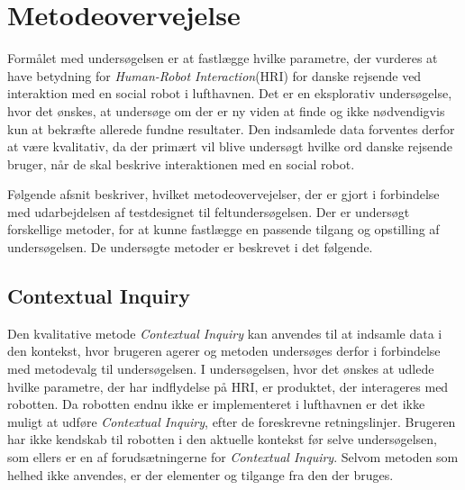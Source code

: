 \section{Metodeovervejelse}
\label{ParametreMetodeovervejelser}
%
Formålet med undersøgelsen er at fastlægge hvilke parametre, der vurderes at have betydning for \textit{Human-Robot Interaction}(HRI) for danske rejsende ved interaktion med en social robot i lufthavnen. Det er en eksplorativ undersøgelse, hvor det ønskes, at undersøge om der er ny viden at finde og ikke nødvendigvis kun at bekræfte allerede fundne resultater. Den indsamlede data forventes derfor at være kvalitativ, da der primært vil blive undersøgt hvilke ord danske rejsende bruger, når de skal beskrive interaktionen med en social robot. 

Følgende afsnit beskriver, hvilket metodeovervejelser, der er gjort i forbindelse med udarbejdelsen af testdesignet til feltundersøgelsen. Der er undersøgt forskellige metoder, for at kunne fastlægge en passende tilgang og opstilling af undersøgelsen. De undersøgte metoder er beskrevet i det følgende. 

\subsection{Contextual Inquiry}
\label{ParametreContextualInquiry}
%
Den kvalitative metode \textit{Contextual Inquiry} kan anvendes til at indsamle data i den kontekst, hvor brugeren agerer og metoden undersøges derfor i forbindelse med metodevalg til undersøgelsen. 
%
%
I undersøgelsen, hvor det ønskes at udlede hvilke parametre, der har indflydelse på HRI, er produktet, der interageres med robotten. Da robotten endnu ikke er implementeret i lufthavnen er det ikke muligt at udføre \textit{Contextual Inquiry}, efter de foreskrevne retningslinjer. Brugeren har ikke kendskab til robotten i den aktuelle kontekst før selve undersøgelsen, som ellers er en af forudsætningerne for \textit{Contextual Inquiry}. Selvom metoden som helhed ikke anvendes, er der elementer og tilgange fra den der bruges.

